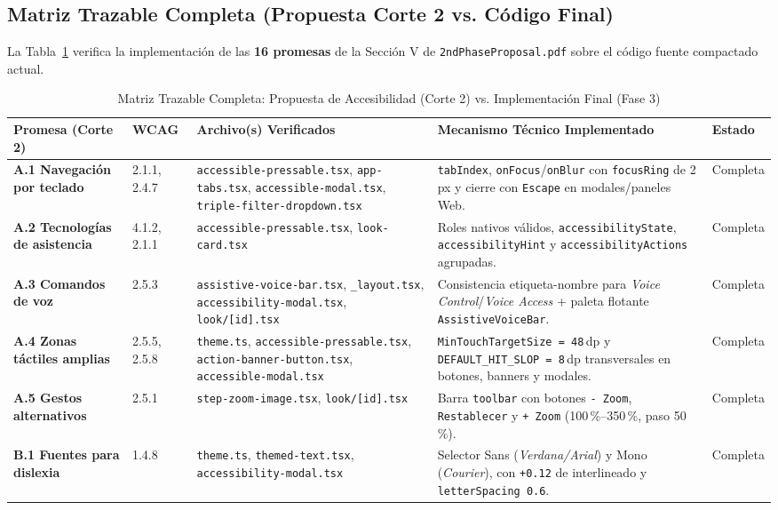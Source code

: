 \documentclass[conference]{IEEEtran}
\begin{document}
\subsection{Matriz Trazable Completa (Propuesta Corte 2 vs. Código Final)}
La Tabla~\ref{tab:trazabilidad} verifica la implementación de las \textbf{16 promesas} de la Sección V de \texttt{2ndPhaseProposal.pdf} sobre el código fuente compactado actual.

\begin{table}[t]
\centering
\caption{Matriz Trazable Completa: Propuesta de Accesibilidad (Corte 2) vs. Implementación Final (Fase 3)}
\label{tab:trazabilidad}
\renewcommand{\arraystretch}{1.15}
\scriptsize
\begin{tabularx}{\textwidth}{>{\bfseries}p{2.7cm} p{1.4cm} p{4.2cm} X p{1.3cm}}
\toprule
Promesa (Corte 2) & WCAG & Archivo(s) Verificados & Mecanismo Técnico Implementado & Estado \\
\midrule
A.1 Navegación por teclado & 2.1.1, 2.4.7~\cite{ref9} & \texttt{accessible-pressable.tsx}, \texttt{app-tabs.tsx}, \texttt{accessible-modal.tsx}, \texttt{triple-filter-dropdown.tsx} & \texttt{tabIndex}, \texttt{onFocus}/\texttt{onBlur} con \texttt{focusRing} de 2\,px y cierre con \texttt{Escape} en modales/paneles Web. & Completa \\
A.2 Tecnologías de asistencia & 4.1.2, 2.1.1 & \texttt{accessible-pressable.tsx}, \texttt{look-card.tsx} & Roles nativos válidos, \texttt{accessibilityState}, \texttt{accessibilityHint} y \texttt{accessibilityActions} agrupadas. & Completa \\
A.3 Comandos de voz & 2.5.3 & \texttt{assistive-voice-bar.tsx}, \texttt{\_layout.tsx}, \texttt{accessibility-modal.tsx}, \texttt{look/[id].tsx} & Consistencia etiqueta-nombre para \textit{Voice Control}/\textit{Voice Access} + paleta flotante \texttt{AssistiveVoiceBar}. & Completa \\
A.4 Zonas táctiles amplias & 2.5.5, 2.5.8~\cite{ref10} & \texttt{theme.ts}, \texttt{accessible-pressable.tsx}, \texttt{action-banner-button.tsx}, \texttt{accessible-modal.tsx} & \texttt{MinTouchTargetSize = 48}\,dp y \texttt{DEFAULT\_HIT\_SLOP = 8}\,dp transversales en botones, banners y modales. & Completa \\
A.5 Gestos alternativos & 2.5.1~\cite{ref11} & \texttt{step-zoom-image.tsx}, \texttt{look/[id].tsx} & Barra \texttt{toolbar} con botones \texttt{- Zoom}, \texttt{Restablecer} y \texttt{+ Zoom} (100\,\%--350\,\%, paso 50\,\%). & Completa \\
B.1 Fuentes para dislexia & 1.4.8~\cite{ref12,ref18} & \texttt{theme.ts}, \texttt{themed-text.tsx}, \texttt{accessibility-modal.tsx} & Selector Sans (\textit{Verdana/Arial}) y Mono (\textit{Courier}), con \texttt{+0.12} de interlineado y \texttt{letterSpacing 0.6}. & Completa \\

\end{tabularx}
\end{table}
\end{document}
